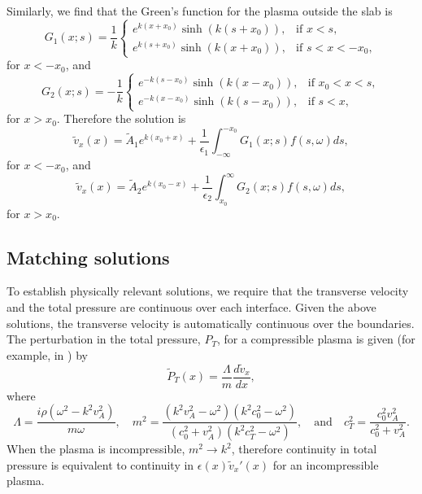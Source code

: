 \documentclass{aastex61}
\begin{document}
Similarly, we find that the Green's function for the plasma outside the slab is 
\begin{equation}
G_1(x;s) = \frac{1}{k}
\begin{cases}
e^{k(x + x_0)}\sinh(k(s + x_0)), & \text{if } x < s, \\
e^{k(s + x_0)}\sinh(k(x + x_0)), & \text{if } s < x < -x_0,
\end{cases}
\end{equation}
for $x < -x_0$, and
\begin{equation}
G_2(x;s) = -\frac{1}{k}
\begin{cases}
e^{-k(s - x_0)}\sinh(k(x - x_0)), & \text{if } x_0 < x < s, \\
e^{-k(x - x_0)}\sinh(k(s - x_0)), & \text{if } s < x,
\end{cases}
\end{equation}
for $x > x_0$. Therefore the solution is
\begin{equation}
\tilde{v}_x(x) = \tilde{A}_1e^{k(x_0 + x)} + \frac{1}{\epsilon_1}\int_{-\infty}^{-x_0} G_1(x;s) f(s, \omega) ds,
\end{equation}
for $x < -x_0$, and
\begin{equation}
\tilde{v}_x(x) = \tilde{A}_2e^{k(x_0 - x)} + \frac{1}{\epsilon_2}\int_{x_0}^{\infty} G_2(x;s) f(s, \omega) ds,
\end{equation}
for $x > x_0$.


\subsection{Matching solutions}
To establish physically relevant solutions, we require that the transverse velocity and the total pressure are continuous over each interface. Given the above solutions, the transverse velocity is automatically continuous over the boundaries. The perturbation in the total pressure, $P_T$, for a compressible plasma is given (for example, in \cite{all_etal17}) by
\begin{equation}
\tilde{P}_T(x) = \frac{\Lambda}{m}\frac{d\tilde{v}_x}{d x},
\end{equation}
where
\begin{equation}
\Lambda = \frac{i\rho(\omega^2 - k^2v_A^2)}{m\omega},
\quad
m^2 = \frac{(k^2v_A^2 - \omega^2)(k^2c_0^2 - \omega^2)}{(c_0^2 + v_A^2)(k^2c_T^2 - \omega^2)},
\quad \text{and} \quad
c_T^2 = \frac{c_0^2 v_A^2}{c_0^2 + v_A^2}.
\end{equation}
When the plasma is incompressible, $m^2 \to k^2$, therefore continuity in total pressure is equivalent to continuity in $\epsilon(x)\tilde{v}_x'(x)$ for an incompressible plasma.
\end{document}

